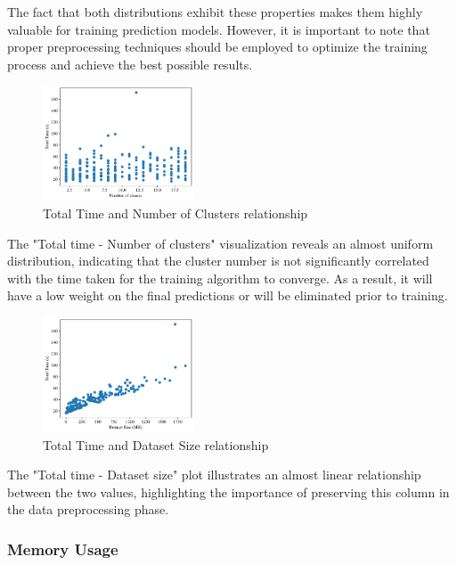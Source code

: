 \documentclass[conference]{IEEEtran}
\begin{document}
The fact that both distributions exhibit these properties makes them highly valuable for training prediction models. However, it is important to note that proper preprocessing techniques should be employed to optimize the training process and achieve the best possible results.

\begin{figure}[ht]
    \centering
\includegraphics[width=0.4\textwidth]{plots/experiment_results/kmeans_time_classes.pdf}
    \caption{Total Time and Number of Clusters relationship}
    \end{figure}
The "Total time - Number of clusters" visualization reveals an almost uniform distribution, indicating that the cluster number is not significantly correlated with the time taken for the training algorithm to converge. As a result, it will have a low weight on the final predictions or will be eliminated prior to training.

\begin{figure}[ht]
    \centering
\includegraphics[width=0.40\textwidth]{plots/experiment_results/kmeans_time_dataset_size.pdf}
    \caption{Total Time and Dataset Size relationship}
\end{figure}


The "Total time - Dataset size" plot illustrates an almost linear relationship between the two values, highlighting the importance of preserving this column in the data preprocessing phase.

\bigskip

\subsubsection{\textbf{Memory Usage}}
\end{document}
